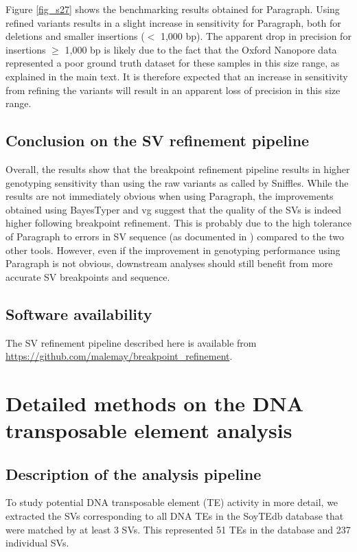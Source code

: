 \documentclass[12pt]{article}
\begin{document}
Figure \ref{fig_s27} shows the benchmarking results obtained for Paragraph.
Using refined variants results in a slight increase in sensitivity for Paragraph, both for deletions and smaller insertions ($<$ 1,000 bp).
The apparent drop in precision for insertions $\geq$ 1,000 bp is likely due to the fact that the Oxford Nanopore data represented a poor ground truth dataset for these samples in this size range, as explained in the main text.
It is therefore expected that an increase in sensitivity from refining the variants will result in an apparent loss of precision in this size range.

\subsection{Conclusion on the SV refinement pipeline}

Overall, the results show that the breakpoint refinement pipeline results in higher genotyping sensitivity than using the raw variants as called by Sniffles.
While the results are not immediately obvious when using Paragraph, the improvements obtained using BayesTyper and vg suggest that the quality of the SVs is indeed higher following breakpoint refinement.
This is probably due to the high tolerance of Paragraph to errors in SV sequence (as documented in \cite{paragraph}) compared to the two other tools.
However, even if the improvement in genotyping performance using Paragraph is not obvious, downstream analyses should still benefit from more accurate SV breakpoints and sequence.

\subsection{Software availability}

The SV refinement pipeline described here is available from \url{https://github.com/malemay/breakpoint_refinement}.

\clearpage

\section{Detailed methods on the DNA transposable element analysis}

\subsection{Description of the analysis pipeline}

To study potential DNA transposable element (TE) activity in more detail, we extracted the SVs corresponding to all DNA TEs in the SoyTEdb database \citep{soytedb} that were matched by at least 3 SVs. 
This represented 51 TEs in the database and 237 individual SVs.
\end{document}
